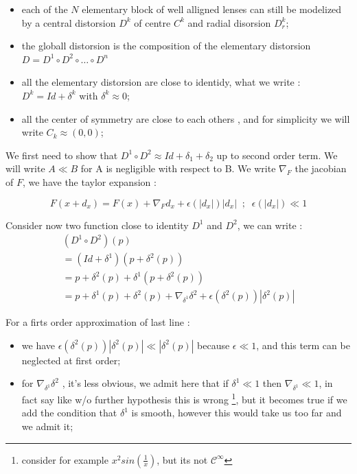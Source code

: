 \begin{itemize}
    \item  each of the $N$ elementary block of well alligned lenses can still be 
           modelized by a central distorsion $D^k$ of centre $C^k$ and radial
           disorsion $D^k_r$;

    \item  the globall distorsion is the composition of the elementary distorsion
           $ D = D^1 \circ D^2 \circ \dots \circ D^n$

    \item  all the elementary distorsion are close to identidy, what we write :
           $D^k = Id + \delta^k$  with $\delta^k \approx 0$;

    \item  all the center of symmetry are close to each others , and for simplicity
           we will write $C_k \approx (0,0)$;
\end{itemize}


We first need to show that $D^1 \circ D^2  \approx Id + \delta_1 + \delta_2$ up to second order term.
We will write $A\ll B$ for A is negligible with respect to B. We write $\nabla_F$
the jacobian of $F$, we have the taylor expansion :

\begin{equation}
	F(x+d_x) = F(x) + \nabla_F d_x + \epsilon(|d_x|) |d_x|  \;\; ; \;\;  \epsilon(|d_x|) \ll 1
\end{equation}


Consider now two function close to identity $D^1$ and $D^2$, we can write :
\begin{equation}
\begin{multlined}
(D^1 \circ D^2)(p)  \\
=  (Id+\delta^1)(p+\delta^2(p))\\
=  p +\delta^2(p) + \delta^1(p+\delta^2(p)) \\
=  p +\delta^1(p) + \delta^2(p) + \nabla_{\delta^1} \delta^2   + \epsilon(\delta^2(p)) |\delta^2(p)|
\end{multlined}
\end{equation}

For a firts order approximation of last line :

\begin{itemize}
   \item we have $\epsilon(\delta^2(p)) |\delta^2(p)|  \ll |\delta^2(p)|$ because $\epsilon\ll 1$,
          and this term can be neglected at first order;

   \item  for  $ \nabla_{\delta^1} \delta^2$ , it's less obvious, we admit here that
          if $\delta^1 \ll 1$ then $ \nabla_{\delta^1} \ll 1$,  in fact say like w/o further hypothesis this
		is wrong \footnote{consider for example $x^2 sin(\frac{1}{x})$, but its not $\mathcal{C}^\infty$}, but it becomes
          true if we add the condition that $\delta^1$ is smooth, however this would take us too far  and we admit it;
\end{itemize}

